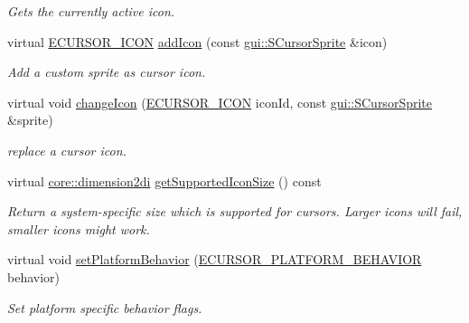 \begin{DoxyCompactItemize}
\begin{DoxyCompactList}\small\item\em Gets the currently active icon. \end{DoxyCompactList}\item 
virtual \hyperlink{namespaceirr_1_1gui_aefee802dd632c5735703e40ef40f879b}{E\+C\+U\+R\+S\+O\+R\+\_\+\+I\+C\+ON} \hyperlink{classirr_1_1gui_1_1ICursorControl_a102ff455c70595886281e636ef063d3b}{add\+Icon} (const \hyperlink{structirr_1_1gui_1_1SCursorSprite}{gui\+::\+S\+Cursor\+Sprite} \&icon)
\begin{DoxyCompactList}\small\item\em Add a custom sprite as cursor icon. \end{DoxyCompactList}\item 
virtual void \hyperlink{classirr_1_1gui_1_1ICursorControl_a3e7c8cb1f03e1ccc31fcc3c30f717762}{change\+Icon} (\hyperlink{namespaceirr_1_1gui_aefee802dd632c5735703e40ef40f879b}{E\+C\+U\+R\+S\+O\+R\+\_\+\+I\+C\+ON} icon\+Id, const \hyperlink{structirr_1_1gui_1_1SCursorSprite}{gui\+::\+S\+Cursor\+Sprite} \&sprite)
\begin{DoxyCompactList}\small\item\em replace a cursor icon. \end{DoxyCompactList}\item 
\mbox{\label{classirr_1_1gui_1_1ICursorControl_a0710b659cbab1474e3486f7dd0e8c35e}} 
virtual \hyperlink{namespaceirr_1_1core_aacaa9f583051276807125e964db2f073}{core\+::dimension2di} \hyperlink{classirr_1_1gui_1_1ICursorControl_a0710b659cbab1474e3486f7dd0e8c35e}{get\+Supported\+Icon\+Size} () const
\begin{DoxyCompactList}\small\item\em Return a system-\/specific size which is supported for cursors. Larger icons will fail, smaller icons might work. \end{DoxyCompactList}\item 
\mbox{\label{classirr_1_1gui_1_1ICursorControl_ad7688bb200945f15877a598e8be53878}} 
virtual void \hyperlink{classirr_1_1gui_1_1ICursorControl_ad7688bb200945f15877a598e8be53878}{set\+Platform\+Behavior} (\hyperlink{namespaceirr_1_1gui_abbd186f9cfba2f805d98248df226acef}{E\+C\+U\+R\+S\+O\+R\+\_\+\+P\+L\+A\+T\+F\+O\+R\+M\+\_\+\+B\+E\+H\+A\+V\+I\+OR} behavior)
\begin{DoxyCompactList}\small\item\em Set platform specific behavior flags. \end{DoxyCompactList}\item 

\end{DoxyCompactItemize}
